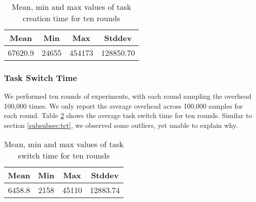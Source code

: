 \begin{table}[htb]

    \caption{Mean, min and max values of task creation time for ten rounds}
\begin{tabular}{|c|c|c|c|} 
    \hline
    Mean & Min & Max & Stddev\\ 
    \hline
    67620.9 & 24655 & 454173 & 128850.70\\ 
    \hline
   \end{tabular}
    \label{tab:t4}
\end{table}

\subsubsection{Task Switch Time}
We performed ten rounds of experiments, with each round sampling the overhead 100,000 times. We only report the average overhead across 100,000 samples for each round.
Table \ref{tab:t5} shows the average task switch time for ten rounds. Similar to section \ref{subsubsec:tct}, we observed some outliers, yet unable to explain why.



\begin{table}[htb]

    \caption{Mean, min and max values of task switch time for ten rounds}
 
\begin{tabular}{|c|c|c|c|} 
    \hline
    Mean & Min & Max & Stddev\\ 
    \hline
    6458.8 & 2158 & 45110 & 12883.74\\ 
    \hline
   \end{tabular}
    \label{tab:t5}
\end{table}